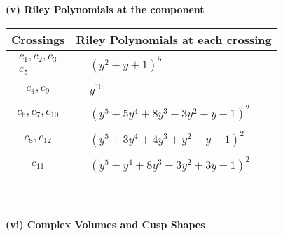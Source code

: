 \documentclass[1p]{elsarticle_modified}
\theoremstyle{definition}
\begin{document}
\newpage\renewcommand{\arraystretch}{1}
\flushleft \textbf{(v) Riley Polynomials at the component}\newline \\
\begin{tabular}{m{50pt}|m{274pt}}
Crossings & \hspace{64pt}Riley Polynomials at each crossing \\
\hline $$\begin{aligned}c_{1},c_{2},c_{3}\\c_{5}\end{aligned}$$&$\begin{aligned}
&(y^2+y+1)^5
\end{aligned}$\\
\hline $$\begin{aligned}c_{4},c_{9}\end{aligned}$$&$\begin{aligned}
&y^{10}
\end{aligned}$\\
\hline $$\begin{aligned}c_{6},c_{7},c_{10}\end{aligned}$$&$\begin{aligned}
&(y^5-5 y^4+8 y^3-3 y^2- y-1)^2
\end{aligned}$\\
\hline $$\begin{aligned}c_{8},c_{12}\end{aligned}$$&$\begin{aligned}
&(y^5+3 y^4+4 y^3+y^2- y-1)^2
\end{aligned}$\\
\hline $$\begin{aligned}c_{11}\end{aligned}$$&$\begin{aligned}
&(y^5- y^4+8 y^3-3 y^2+3 y-1)^2
\end{aligned}$\\
\hline
\end{tabular}\\~\\
\newpage\flushleft \textbf{(vi) Complex Volumes and Cusp Shapes}
\end{document}
